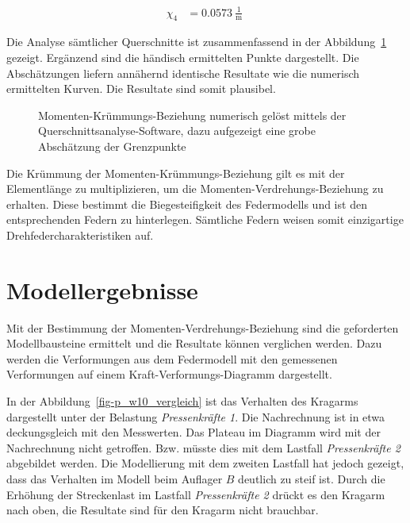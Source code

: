 \documentclass[
  11pt,
  letterpaper,
]{scrreprt}
\begin{document}
$$
\begin{aligned}
\chi_{4} &= 0.0573\ \frac{1}{\mathrm{m}} \;
\end{aligned}
$$

Die Analyse sämtlicher Querschnitte ist zusammenfassend in der
Abbildung~\ref{fig-m_chi_schaetzung} gezeigt. Ergänzend sind die
händisch ermittelten Punkte dargestellt. Die Abschätzungen liefern
annähernd identische Resultate wie die numerisch ermittelten Kurven. Die
Resultate sind somit plausibel.

\begin{figure}[H]


\caption{\label{fig-m_chi_schaetzung}Momenten-Krümmungs-Beziehung
numerisch gelöst mittels der Querschnittsanalyse-Software, dazu
aufgezeigt eine grobe Abschätzung der Grenzpunkte}

\end{figure}%

Die Krümmung der Momenten-Krümmungs-Beziehung gilt es mit der
Elementlänge zu multiplizieren, um die Momenten-Verdrehungs-Beziehung zu
erhalten. Diese bestimmt die Biegesteifigkeit des Federmodells und ist
den entsprechenden Federn zu hinterlegen. Sämtliche Federn weisen somit
einzigartige Drehfedercharakteristiken auf.

\section{Modellergebnisse}\label{modellergebnisse-2}

Mit der Bestimmung der Momenten-Verdrehungs-Beziehung sind die
geforderten Modellbausteine ermittelt und die Resultate können
verglichen werden. Dazu werden die Verformungen aus dem Federmodell mit
den gemessenen Verformungen auf einem Kraft-Verformungs-Diagramm
dargestellt.

In der Abbildung~\ref{fig-p_w10_vergleich} ist das Verhalten des
Kragarms dargestellt unter der Belastung \emph{Pressenkräfte 1}. Die
Nachrechnung ist in etwa deckungsgleich mit den Messwerten. Das Plateau
im Diagramm wird mit der Nachrechnung nicht getroffen. Bzw. müsste dies
mit dem Lastfall \emph{Pressenkräfte 2} abgebildet werden. Die
Modellierung mit dem zweiten Lastfall hat jedoch gezeigt, dass das
Verhalten im Modell beim Auflager \(B\) deutlich zu steif ist. Durch die
Erhöhung der Streckenlast im Lastfall \emph{Pressenkräfte 2} drückt es
den Kragarm nach oben, die Resultate sind für den Kragarm nicht
brauchbar.
\end{document}
